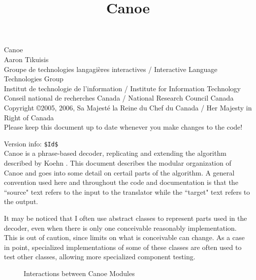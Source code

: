 \documentclass[12pt]{amsart} \usepackage{epsfig} \usepackage{rotating}
\begin{document}
\title{Canoe} \maketitle

{\tiny
\noindent
   Canoe\\ 
   Aaron Tikuisis\\ 
   Groupe de technologies langagi{\`e}res interactives /
      Interactive Language Technologies Group\\
   Institut de technologie de l'information /
      Institute for Information Technology\\
   Conseil national de recherches Canada / National Research Council Canada\\ 
   Copyright \copyright 2005, 2006, Sa Majest{\'e} la Reine du Chef du Canada /
      Her Majesty in Right of Canada }
\\

\noindent
Please keep this document up to date whenever you make changes to the code!

{\tiny
\noindent
Version info: \verb+$Id$+
}
\\

Canoe is a phrase-based decoder, replicating and extending the
algorithm described by Koehn \cite{koehn03}.  This document
describes the modular organization of Canoe and goes into some detail on
certail parts of the algorithm.  A general convention used here and throughout
the code and documentation is that the ``source" text refers to the input to
the translator while the ``target" text refers to the output.

It may be noticed that I often use abstract classes to represent parts used in
the decoder, even when there is only one conceivable reasonably implementation.
This is out of caution, since limits on what is conceivable can change.  As a
case in point, specialized implementations of some of these classes are often
used to test other classes, allowing more specialized component testing.

\begin{sidewaysfigure}
\centerline{}
\caption{Interactions between Canoe Modules\label{fig:uml}}
\end{sidewaysfigure}
\end{document}

